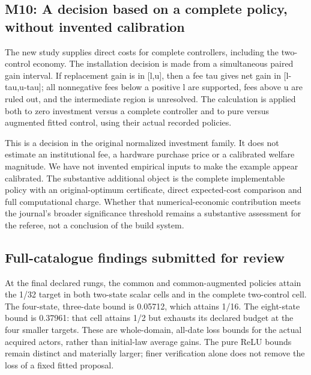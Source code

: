 \hypertarget{m10-a-decision-based-on-a-complete-policy-without-invented-calibration}{%
\subsection{M10: A decision based on a complete policy, without invented
calibration}\label{m10-a-decision-based-on-a-complete-policy-without-invented-calibration}}

The new study supplies direct costs for complete controllers, including
the two-control economy. The installation decision is made from a
simultaneous paired gain interval. If replacement gain is in {[}l,u{]},
then a fee tau gives net gain in {[}l-tau,u-tau{]}; all nonnegative fees
below a positive l are supported, fees above u are ruled out, and the
intermediate region is unresolved. The calculation is applied both to
zero investment versus a complete controller and to pure versus
augmented fitted control, using their actual recorded policies.

This is a decision in the original normalized investment family. It does
not estimate an institutional fee, a hardware purchase price or a
calibrated welfare magnitude. We have not invented empirical inputs to
make the example appear calibrated. The substantive additional object is
the complete implementable policy with an original-optimum certificate,
direct expected-cost comparison and full computational charge. Whether
that numerical-economic contribution meets the journal's broader
significance threshold remains a substantive assessment for the referee,
not a conclusion of the build system.

\hypertarget{full-catalogue-findings-submitted-for-review}{%
\subsection{Full-catalogue findings submitted for
review}\label{full-catalogue-findings-submitted-for-review}}

At the final declared rungs, the common and common-augmented policies
attain the 1/32 target in both two-state scalar cells and in the
complete two-control cell. The four-state, three-date bound is 0.05712,
which attains 1/16. The eight-state bound is 0.37961: that cell attains
1/2 but exhausts its declared budget at the four smaller targets. These
are whole-domain, all-date loss bounds for the actual acquired actors,
rather than initial-law average gains. The pure ReLU bounds remain
distinct and materially larger; finer verification alone does not remove
the loss of a fixed fitted proposal.

